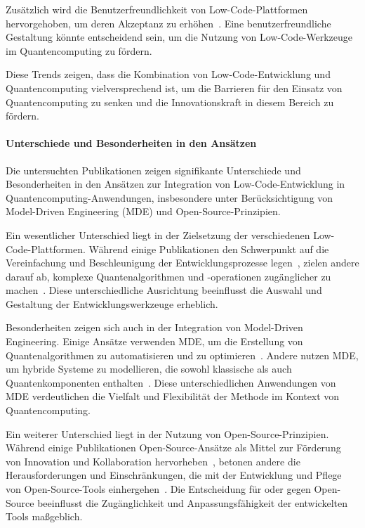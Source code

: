 Zusätzlich wird die Benutzerfreundlichkeit von Low-Code-Plattformen hervorgehoben, um deren Akzeptanz zu erhöhen~\cite{Pinho_2022, Prinz_2021}. 
Eine benutzerfreundliche Gestaltung könnte entscheidend sein, um die Nutzung von Low-Code-Werkzeuge im Quantencomputing zu fördern.

Diese Trends zeigen, dass die Kombination von Low-Code-Entwicklung und Quantencomputing vielversprechend ist, um die 
Barrieren für den Einsatz von Quantencomputing zu senken und die Innovationskraft in diesem Bereich zu fördern.

\paragraph{Unterschiede und Besonderheiten in den Ansätzen}

Die untersuchten Publikationen zeigen signifikante Unterschiede und Besonderheiten in den Ansätzen 
zur Integration von Low-Code-Entwicklung in Quantencomputing-Anwendungen, insbesondere unter Berücksichtigung 
von Model-Driven Engineering (MDE) und Open-Source-Prinzipien.

Ein wesentlicher Unterschied liegt in der Zielsetzung der verschiedenen Low-Code-Plattformen. 
Während einige Publikationen den Schwerpunkt auf die Vereinfachung und Beschleunigung der 
Entwicklungsprozesse legen~\cite{Sahay_2020, Khorram_2020}, zielen andere darauf ab, komplexe 
Quantenalgorithmen und -operationen zugänglicher zu machen~\cite{Gemeinhardt_2021, Gemeinhardt_2023}. 
Diese unterschiedliche Ausrichtung beeinflusst die Auswahl und Gestaltung der Entwicklungswerkzeuge erheblich.

Besonderheiten zeigen sich auch in der Integration von Model-Driven Engineering. Einige Ansätze 
verwenden MDE, um die Erstellung von Quantenalgorithmen zu automatisieren und zu optimieren~\cite{Moin_2021, Perez-Castillo_2022}. 
Andere nutzen MDE, um hybride Systeme zu modellieren, die sowohl klassische als auch Quantenkomponenten 
enthalten~\cite{Weder_2020, Polat_2024}. Diese unterschiedlichen Anwendungen von MDE verdeutlichen die Vielfalt 
und Flexibilität der Methode im Kontext von Quantencomputing.

Ein weiterer Unterschied liegt in der Nutzung von Open-Source-Prinzipien. Während einige Publikationen Open-Source-Ansätze 
als Mittel zur Förderung von Innovation und Kollaboration hervorheben~\cite{Amato_2023, Ahmad_2023}, betonen andere die 
Herausforderungen und Einschränkungen, die mit der Entwicklung und Pflege von Open-Source-Tools einhergehen~\cite{Sanchez_2021}. 
Die Entscheidung für oder gegen Open-Source beeinflusst die Zugänglichkeit und Anpassungsfähigkeit der entwickelten Tools maßgeblich.

